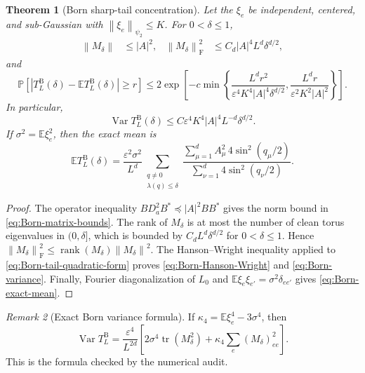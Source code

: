 \documentclass[11pt]{article}
\newtheorem{theorem}{Theorem}[section]
\theoremstyle{definition}
\theoremstyle{remark}
\newtheorem{remark}[theorem]{Remark}
\newcommand{\E}{\mathbb E}
\newcommand{\Prob}{\mathbb P}
\newcommand{\tr}{\operatorname{tr}}
\newcommand{\Var}{\operatorname{Var}}
\newcommand{\norm}[1]{\left\lVert #1\right\rVert}
\newcommand{\abs}[1]{\left\lvert #1\right\rvert}
\newcommand{\eps}{\varepsilon}
\begin{document}
\begin{theorem}[Born sharp-tail concentration]
\label{thm:Born-sharp-concentration}
Let the $\xi_e$ be independent, centered, and sub-Gaussian with
$\norm{\xi_e}_{\psi_2}\le K$.  For $0<\delta\le1$,
\begin{align}
 \norm{M_\delta}&\le\abs A^2,
 &
 \norm{M_\delta}_{\mathrm F}^2
 &\le C_d\abs A^4L^d\delta^{d/2},
 \label{eq:Born-matrix-bounds}
\end{align}
and
\begin{equation}
 \boxed{
 \Prob\left[
 \abs{T_L^{\mathrm B}(\delta)-\E T_L^{\mathrm B}(\delta)}\ge r
 \right]
 \le2\exp\left[-c\min\left\{
 \frac{L^dr^2}{\eps^4K^4\abs A^4\delta^{d/2}},
 \frac{L^dr}{\eps^2K^2\abs A^2}
 \right\}\right].}
 \label{eq:Born-Hanson-Wright}
\end{equation}
In particular,
\begin{equation}
 \Var T_L^{\mathrm B}(\delta)
 \le C\eps^4K^4\abs A^4L^{-d}\delta^{d/2}.
 \label{eq:Born-variance}
\end{equation}
If $\sigma^2=\E\xi_e^2$, then the exact mean is
\begin{equation}
 \boxed{
 \E T_L^{\mathrm B}(\delta)
 =\frac{\eps^2\sigma^2}{L^d}
 \sum_{\substack{q\ne0\\\lambda(q)\le\delta}}
 \frac{\sum_{\mu=1}^dA_\mu^2\,4\sin^2(q_\mu/2)}{\sum_{\nu=1}^d4\sin^2(q_\nu/2)}.}
 \label{eq:Born-exact-mean}
\end{equation}
\end{theorem}

\begin{proof}
The operator inequality
$BD_a^2B^*\preceq\abs A^2BB^*$ gives the norm bound in
\eqref{eq:Born-matrix-bounds}.  The rank of $M_\delta$ is at most the number
of clean torus eigenvalues in $(0,\delta]$, which is bounded by
$C_dL^d\delta^{d/2}$ for $0<\delta\le1$.  Hence
$\norm{M_\delta}_{\mathrm F}^2\le
\operatorname{rank}(M_\delta)\norm{M_\delta}^2$.
The Hanson--Wright inequality \cite{RudelsonVershynin2013} applied to
\eqref{eq:Born-tail-quadratic-form} proves
\eqref{eq:Born-Hanson-Wright} and \eqref{eq:Born-variance}.
Finally, Fourier diagonalization of $L_0$ and
$\E\xi_e\xi_{e'}=\sigma^2\delta_{ee'}$ gives
\eqref{eq:Born-exact-mean}.
\end{proof}

\begin{remark}[Exact Born variance formula]
If $\kappa_4=\E\xi_e^4-3\sigma^4$, then
\begin{equation}
 \Var T_L^{\mathrm B}
 =\frac{\eps^4}{L^{2d}}
 \left[2\sigma^4\tr(M_\delta^2)
 +\kappa_4\sum_e(M_\delta)_{ee}^2\right].
 \label{eq:Born-exact-variance}
\end{equation}
This is the formula checked by the numerical audit.
\end{remark}
\end{document}
